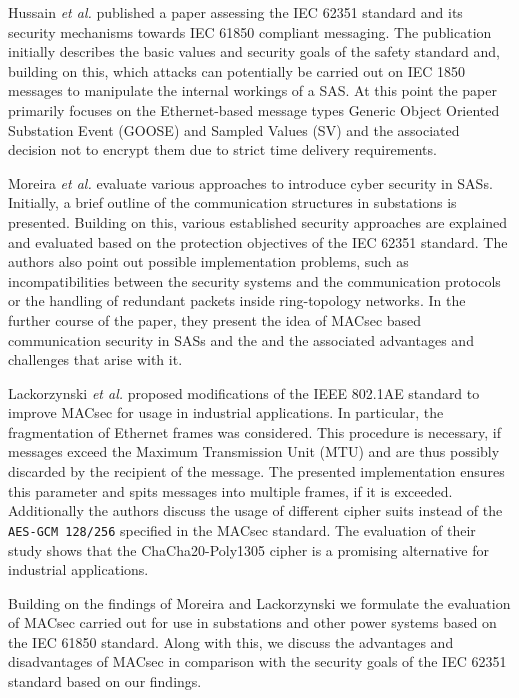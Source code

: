 \documentclass[conference]{IEEEtran}
\begin{document}
\smallskip
Hussain  \textit{et al.} \cite{Review_IEC62351:2019} published a paper assessing the IEC 62351 standard and its security mechanisms towards IEC 61850 
compliant messaging. The publication initially describes the basic values and security goals of the safety standard and, building on this, which attacks 
can potentially be carried out on IEC 1850 messages to manipulate the internal workings of a SAS. At this point the paper primarily focuses on the 
Ethernet-based message types Generic Object Oriented Substation Event (GOOSE) and Sampled Values (SV) and the associated decision not to encrypt them due 
to strict time delivery requirements.  

\smallskip
Moreira  \textit{et al.} \cite{Cybersecurity_Substation:2016} evaluate various approaches to introduce cyber security in SASs. Initially, a brief outline 
of the communication structures in substations is presented. Building on this, various established security approaches are explained and evaluated based 
on the protection objectives of the IEC 62351 standard. The authors also point out possible implementation problems, such as incompatibilities between 
the security systems and the communication protocols or the handling of redundant packets inside ring-topology networks. In the further course of the 
paper, they present the idea of MACsec based communication security in SASs and the and the associated advantages and challenges that arise with it. 

\smallskip
Lackorzynski \textit{et al.} \cite{MACsecIndustrialOptimization:2020} proposed modifications of the IEEE 802.1AE standard to improve MACsec for usage in 
industrial applications. In particular, the fragmentation of Ethernet frames was considered. This procedure is necessary, if messages exceed the Maximum 
Transmission Unit (MTU) and are thus possibly discarded by the recipient of the message. The presented implementation ensures this parameter and spits 
messages into multiple frames, if it is exceeded. Additionally the authors discuss the usage of different cipher suits instead of the \texttt{AES-GCM 128/256} 
specified in the MACsec standard. The evaluation of their study shows that the ChaCha20-Poly1305 cipher is a promising alternative for industrial 
applications.

\smallskip 
Building on the findings of Moreira \cite{Cybersecurity_Substation:2016} and Lackorzynski \cite{MACsecIndustrialOptimization:2020} we formulate the 
evaluation of MACsec carried out for use in substations and other power systems based on the IEC 61850 standard. Along with this, we discuss the 
advantages and disadvantages of MACsec in comparison with the security goals of the IEC 62351 standard based on our findings. 
\end{document}
